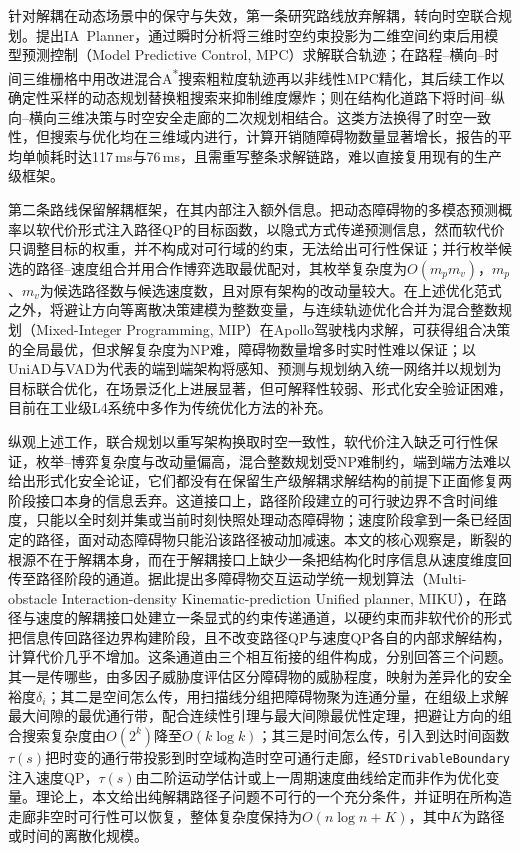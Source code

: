 \documentclass[a4paper,zihao=5]{ctexart}
\theoremstyle{definition}
\begin{document}
针对解耦在动态场景中的保守与失效，第一条研究路线放弃解耦，转向时空联合规划。\citet{yang2021_ia_planner}提出IA~Planner，通过瞬时分析将三维时空约束投影为二维空间约束后用模型预测控制（Model Predictive Control, MPC）求解联合轨迹；\citet{hu2023_hybrid_astar_slt}在路程--横向--时间三维栅格中用改进混合A\textsuperscript{*}搜索粗粒度轨迹再以非线性MPC精化，其后续工作\citep{hu2025_dp_nmpc}以确定性采样的动态规划替换粗搜索来抑制维度爆炸；\citet{qiao2025stjoint}则在结构化道路下将时间--纵向--横向三维决策与时空安全走廊的二次规划相结合。这类方法换得了时空一致性，但搜索与优化均在三维域内进行，计算开销随障碍物数量显著增长，\citet{hu2023_hybrid_astar_slt}报告的平均单帧耗时达117\,ms与76\,ms，且需重写整条求解链路，难以直接复用现有的生产级框架。

第二条路线保留解耦框架，在其内部注入额外信息。\citet{han2026_contingency}把动态障碍物的多模态预测概率以软代价形式注入路径QP的目标函数，以隐式方式传递预测信息，然而软代价只调整目标的权重，并不构成对可行域的约束，无法给出可行性保证；\citet{zhang2023_dp_rcg}并行枚举候选的路径--速度组合并用合作博弈选取最优配对，其枚举复杂度为$O(m_p m_v)$，$m_p$、$m_v$为候选路径数与候选速度数，且对原有架构的改动量较大。在上述优化范式之外，\citet{kessler2023}将避让方向等离散决策建模为整数变量，与连续轨迹优化合并为混合整数规划（Mixed-Integer Programming, MIP）在Apollo驾驶栈内求解，可获得组合决策的全局最优，但求解复杂度为NP难，障碍物数量增多时实时性难以保证；以UniAD\citep{hu2023uniad}与VAD\citep{jiang2023vad}为代表的端到端架构将感知、预测与规划纳入统一网络并以规划为目标联合优化\citep{li2024decision,zhang2018autonomous}，在场景泛化上进展显著，但可解释性较弱、形式化安全验证困难，目前在工业级L4系统中多作为传统优化方法的补充。

纵观上述工作，联合规划以重写架构换取时空一致性，软代价注入缺乏可行性保证，枚举--博弈复杂度与改动量偏高，混合整数规划受NP难制约，端到端方法难以给出形式化安全论证，它们都没有在保留生产级解耦求解结构的前提下正面修复两阶段接口本身的信息丢弃。这道接口上，路径阶段建立的可行驶边界不含时间维度，只能以全时刻并集或当前时刻快照处理动态障碍物；速度阶段拿到一条已经固定的路径，面对动态障碍物只能沿该路径被动加减速。本文的核心观察是，断裂的根源不在于解耦本身，而在于解耦接口上缺少一条把结构化时序信息从速度维度回传至路径阶段的通道。据此提出多障碍物交互运动学统一规划算法（Multi-obstacle Interaction-density Kinematic-prediction Unified planner, MIKU），在路径与速度的解耦接口处建立一条显式的约束传递通道，以硬约束而非软代价的形式把信息传回路径边界构建阶段，且不改变路径QP与速度QP各自的内部求解结构，计算代价几乎不增加。这条通道由三个相互衔接的组件构成，分别回答三个问题。其一是传哪些，由多因子威胁度评估区分障碍物的威胁程度，映射为差异化的安全裕度$\delta_i$；其二是空间怎么传，用扫描线分组把障碍物聚为连通分量，在组级上求解最大间隙的最优通行带，配合连续性引理与最大间隙最优性定理，把避让方向的组合搜索复杂度由$O(2^k)$降至$O(k\log k)$；其三是时间怎么传，引入到达时间函数$\tau(s)$把时变的通行带投影到时空域构造时空可通行走廊，经\texttt{STDrivableBoundary}注入速度QP，$\tau(s)$由二阶运动学估计或上一周期速度曲线给定而非作为优化变量。理论上，本文给出纯解耦路径子问题不可行的一个充分条件，并证明在所构造走廊非空时可行性可以恢复，整体复杂度保持为$O(n\log n + K)$，其中$K$为路径或时间的离散化规模。
\end{document}
